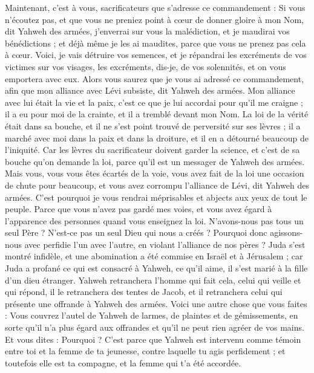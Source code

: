 \begin{multicols}{2}
\VerseOne{}Maintenant, c’est à vous, sacrificateurs que s'adresse ce commandement :
Si vous n'écoutez pas, et que vous ne preniez point à cœur de donner gloire à mon Nom, dit Yahweh des armées, j'enverrai sur vous la malédiction, et je maudirai vos bénédictions ; et déjà même je les ai maudites, parce que vous ne prenez pas cela à cœur.
Voici, je vais détruire vos semences, et je répandrai les excréments de vos victimes sur vos visages, les excréments, dis-je, de vos solennités, et on vous emportera avec eux.
Alors vous saurez que je vous ai adressé ce commandement, afin que mon alliance avec Lévi subsiste, dit Yahweh des armées.
Mon alliance avec lui était la vie et la paix, c’est ce que je lui accordai pour qu’il me craigne ; il a eu pour moi de la crainte, et il a tremblé devant mon Nom.
La loi de la vérité était dans sa bouche, et il ne s'est point trouvé de perversité sur ses lèvres ; il a marché avec moi dans la paix et dans la droiture, et il en a détourné beaucoup de l'iniquité.
Car les lèvres du sacrificateur doivent garder la science, et c’est de sa bouche qu’on demande la loi, parce qu'il est un messager de Yahweh des armées.
Mais vous, vous vous êtes écartés de la voie, vous avez fait de la loi une occasion de chute pour beaucoup, et vous avez corrompu l'alliance de Lévi, dit Yahweh des armées.
C'est pourquoi je vous rendrai méprisables et abjects aux yeux de tout le peuple. Parce que vous n’avez pas gardé mes voies, et vous avez égard à l'apparence des personnes quand vous enseignez la loi.
N'avons-nous pas tous un seul Père ? N’est-ce pas un seul Dieu qui nous a créés ? Pourquoi donc agissons-nous avec perfidie l’un avec l’autre, en violant l'alliance de nos pères ?
Juda s’est montré infidèle, et une abomination a été commise en Israël et à Jérusalem ; car Juda a profané ce qui est consacré à Yahweh, ce qu’il aime, il s'est marié à la fille d'un dieu étranger.
Yahweh retranchera l’homme qui fait cela, celui qui veille et qui répond, il le retranchera des tentes de Jacob, et il retranchera celui qui présente une offrande à Yahweh des armées.
Voici une autre chose que vous faites : Vous couvrez l'autel de Yahweh de larmes, de plaintes et de gémissements, en sorte qu’il n’a plus égard aux offrandes et qu’il ne peut rien agréer de vos mains.
Et vous dites : Pourquoi ? C'est parce que Yahweh est intervenu comme témoin entre toi et la femme de ta jeunesse, contre laquelle tu agis perfidement ; et toutefois elle est ta compagne, et la femme qui t'a été accordée.

\end{multicols}
